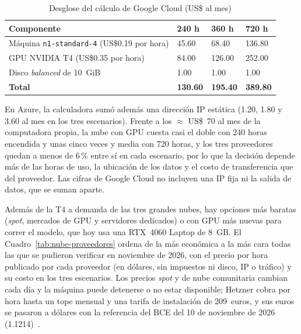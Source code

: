 \documentclass[12pt,a4paper]{article}
\begin{document}
\begin{table}[H]
\caption{Desglose del cálculo de Google Cloud (US\$ al mes)}
\label{tab:nube-gcp}
\centering
\footnotesize
\renewcommand{\arraystretch}{1.15}
\begin{tabular}{|L{0.40\textwidth}|R{0.12\textwidth}|R{0.12\textwidth}|R{0.12\textwidth}|}
\hline
\textbf{Componente} & \textbf{240 h} & \textbf{360 h} & \textbf{720 h} \\
\hline
Máquina \texttt{n1-standard-4} (US\$0.19 por hora) & 45.60 & 68.40 & 136.80 \\
\hline
GPU NVIDIA T4 (US\$0.35 por hora) & 84.00 & 126.00 & 252.00 \\
\hline
Disco \textit{balanced} de 10~GiB & 1.00 & 1.00 & 1.00 \\
\hline
\textbf{Total} & \textbf{130.60} & \textbf{195.40} & \textbf{389.80} \\
\hline
\end{tabular}
\end{table}

En Azure, la calculadora sumó además una dirección IP estática (1.20, 1.80 y
3.60 al mes en los tres escenarios). Frente a los $\approx$ US\$~70 al mes de la
computadora propia, la nube con GPU cuesta casi el doble con 240 horas
encendida y unas cinco veces y media con 720 horas, y los tres proveedores
quedan a menos de 6\,\% entre sí en cada escenario, por lo que la decisión
depende más de las horas de uso, la ubicación de los datos y el costo de
transferencia que del proveedor. Las cifras de Google Cloud no incluyen una IP
fija ni la salida de datos, que se suman aparte.

Además de la T4 a demanda de las tres grandes nubes, hay opciones más baratas
(\textit{spot}, mercados de GPU y servidores dedicados) o con GPU más nuevas
para correr el modelo, que hoy usa una RTX~4060 Laptop de 8~GB. El
Cuadro~\ref{tab:nube-proveedores} ordena de la más económica a la más cara
todas las que se pudieron verificar en noviembre de 2026, con el precio por hora
publicado por cada proveedor (en dólares, sin impuestos ni disco, IP o
tráfico) y su costo en los tres escenarios. Los precios \textit{spot} y de
nube comunitaria cambian cada día y la máquina puede detenerse o no estar
disponible; Hetzner cobra por hora hasta un tope mensual y una tarifa de
instalación de 209~euros, y sus euros se pasaron a dólares con la referencia
del BCE del 10 de noviembre de 2026 (1.1214)~\cite{ecb-eurusd}.
\end{document}
